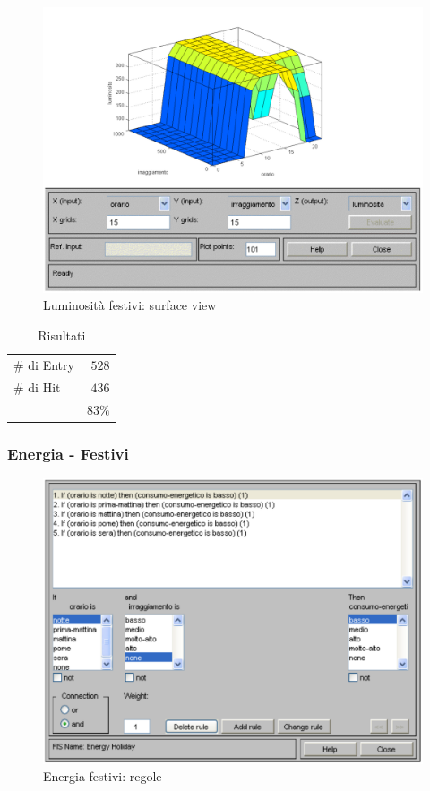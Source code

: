\begin{figure}[htbp]
  \centering
  \includegraphics[scale=0.5]{images/fuzzy/luminosita_festivi_surface_view.pdf}
  \caption{Luminosità festivi: surface view}
\end{figure}

\begin{table}
  \caption{Risultati}
  \centering
	\begin{tabular}{lr}
		\toprule
      \# di Entry & $ 528 $ \\
			\# di Hit   & $ 436 $ \\
		\midrule
			& $ 83\% $ \\
		\bottomrule
	\end{tabular}
\end{table}


\subsubsection{Energia - Festivi}

\begin{figure}[htbp]
  \centering
  \includegraphics[scale=0.5]{images/fuzzy/energia_festivi_regole.pdf}
  \caption{Energia festivi: regole}
\end{figure}


